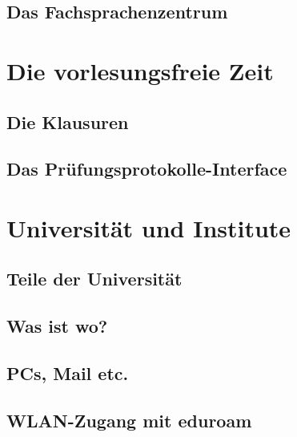 \documentclass[12pt, a4paper]{article}
\newif\ifinfo
\begin{document}
\subsection{Das Fachsprachenzentrum}


\pagebreak
\section{Die vorlesungsfreie Zeit}
\subsection{Die Klausuren}
\ifinfo
	
\else
	
\fi

\subsection{Das Prüfungsprotokolle-Interface}

\ifinfo
\else
	\vfill
\fi

\ifinfo
	\subsection{Praktika}
	
\fi

\pagebreak

\section{Universität und Institute}
\subsection{Teile der Universität}
\ifinfo
	
\else
	
\fi

\subsection{Was ist wo?}
\ifinfo
	
\else
	
\fi

\pagebreak
\subsection{PCs, Mail etc.}
	
\subsection{WLAN-Zugang mit eduroam}
	
\end{document}
